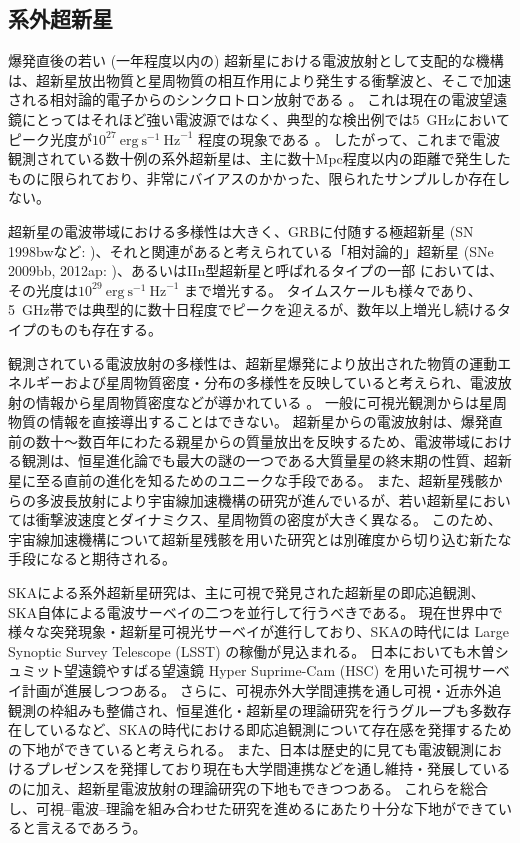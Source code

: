 \subsection{系外超新星} \label{transients.s3.sn}

爆発直後の若い (一年程度以内の) 超新星における電波放射として支配的な機構は、超新星放出物質と星周物質の相互作用により発生する衝撃波と、そこで加速される相対論的電子からのシンクロトロン放射である \citep[e.g.,][]{1998ApJ...499..810C}。
これは現在の電波望遠鏡にとってはそれほど強い電波源ではなく、典型的な検出例では5~GHzにおいてピーク光度が$10^{27}~\text{erg}~\text{s}^{-1}~\text{Hz}^{-1}$ 程度の現象である \citep[e.g.,][]{2014arXiv1409.1827P}。
したがって、これまで電波観測されている数十例の系外超新星は、主に数十Mpc程度以内の距離で発生したものに限られており、非常にバイアスのかかった、限られたサンプルしか存在しない。

超新星の電波帯域における多様性は大きく、GRBに付随する極超新星 (SN 1998bwなど: \citealp{1998Natur.395..670G})、それと関連があると考えられている「相対論的」超新星 (SNe 2009bb, 2012ap: \citealp{2010Natur.463..513S})、あるいはIIn型超新星と呼ばれるタイプの一部 \citep[e.g.,][]{2012ApJ...755..110C} においては、その光度は$10^{29}~\text{erg}~\text{s}^{-1}~\text{Hz}^{-1}$ まで増光する。
タイムスケールも様々であり、5~GHz帯では典型的に数十日程度でピークを迎えるが、数年以上増光し続けるタイプのものも存在する。

観測されている電波放射の多様性は、超新星爆発により放出された物質の運動エネルギーおよび星周物質密度・分布の多様性を反映していると考えられ、電波放射の情報から星周物質密度などが導かれている \citep[e.g.,][]{2012ApJ...758...81M}。
一般に可視光観測からは星周物質の情報を直接導出することはできない。
超新星からの電波放射は、爆発直前の数十～数百年にわたる親星からの質量放出を反映するため、電波帯域における観測は、恒星進化論でも最大の謎の一つである大質量星の終末期の性質、超新星に至る直前の進化を知るためのユニークな手段である。
また、超新星残骸からの多波長放射により宇宙線加速機構の研究が進んでいるが、若い超新星においては衝撃波速度とダイナミクス、星周物質の密度が大きく異なる。
このため、宇宙線加速機構について超新星残骸を用いた研究とは別確度から切り込む新たな手段になると期待される。

SKAによる系外超新星研究は、主に可視で発見された超新星の即応追観測、SKA自体による電波サーベイの二つを並行して行うべきである。
現在世界中で様々な突発現象・超新星可視光サーベイが進行しており、SKAの時代には Large Synoptic Survey Telescope (LSST) の稼働が見込まれる。
日本においても木曽シュミット望遠鏡やすばる望遠鏡 Hyper Suprime-Cam (HSC) を用いた可視サーベイ計画が進展しつつある。
さらに、可視赤外大学間連携を通し可視・近赤外追観測の枠組みも整備され、恒星進化・超新星の理論研究を行うグループも多数存在しているなど、SKAの時代における即応追観測について存在感を発揮するための下地ができていると考えられる。
また、日本は歴史的に見ても電波観測におけるプレゼンスを発揮しており現在も大学間連携などを通し維持・発展しているのに加え、超新星電波放射の理論研究の下地もできつつある。
これらを総合し、可視--電波--理論を組み合わせた研究を進めるにあたり十分な下地ができていると言えるであろう。

